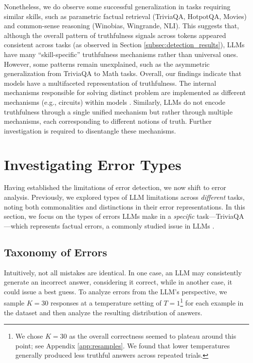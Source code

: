 \documentclass{article} %
\begin{document}
Nonetheless, we do observe some successful generalization in tasks requiring similar skills, such as parametric factual retrieval (TriviaQA, HotpotQA, Movies) and common-sense reasoning (Winobias, Wingrande, NLI).
This suggests that, although the overall pattern of truthfulness signals across tokens appeared consistent across tasks (as observed in Section \ref{subsec:detection_results}), LLMs have many ``skill-specific'' truthfulness mechanisms rather than universal ones.
However, some patterns remain unexplained, such as the asymmetric generalization from TriviaQA to Math tasks.
Overall, our findings indicate that models have a multifaceted representation of truthfulness. 
The internal mechanisms responsible for solving distinct problem are implemented as different mechanisms (e.g., circuits) within models \citep{elhage2021mathematical, olah2023monosemantic}.
Similarly, LLMs do not encode truthfulness through a single unified mechanism but rather through multiple mechanisms, each corresponding to different notions of truth.
Further investigation is required to disentangle these mechanisms.

\vspace{-1em}
\section{Investigating Error Types}
\label{sec:error_types}

Having established the limitations of error detection, we now shift to error analysis.
Previously, we explored types of LLM limitations across \textit{different} tasks, noting both commonalities and distinctions in their error representations.
In this section, we focus on the types of errors LLMs make in a \textit{specific} task---TriviaQA---which represents factual errors, a commonly studied issue in LLMs \citep{kadavath2022language,snyder2023earlydetectionhallucinationsfactual,li2024inference,chen2024inside,simhi2024constructing}.

\subsection{Taxonomy of Errors}
\label{subsec:taxonomy}

Intuitively, not all mistakes are identical.
In one case, an LLM may consistently generate an incorrect answer, considering it correct, while in another case, it could issue a best guess.
To analyze errors from the LLM's perspective, we sample $K=30$ responses at a temperature setting of $T=1$\footnote{We chose $K=30$ as the overall correctness seemed to plateau around this point; see Appendix \ref{app:resamples}. We found that lower temperatures generally produced less truthful answers across repeated trials.} for each example in the dataset and then analyze the resulting distribution of answers.
\end{document}
